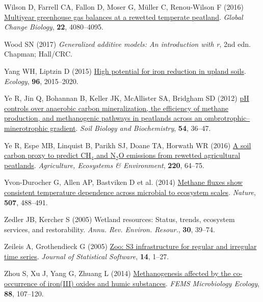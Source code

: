 \documentclass[
  12pt,
]{article}
\newlength{\cslhangindent}
\newenvironment{CSLReferences}[2] %
 {\begin{list}{}{%
  \setlength{\itemindent}{0pt}
  \setlength{\leftmargin}{0pt}
  \setlength{\parsep}{0pt}
  \ifodd #1
   \setlength{\leftmargin}{\cslhangindent}
   \setlength{\itemindent}{-1\cslhangindent}
  \fi
  \setlength{\itemsep}{#2\baselineskip}}}
 {\end{list}}
\begin{document}
\begin{CSLReferences}{1}{0}
Wilson D, Farrell CA, Fallon D, Moser G, Müller C, Renou-Wilson F (2016)
\href{https://doi.org/10.1111/gcb.13325}{Multiyear greenhouse gas
balances at a rewetted temperate peatland}. \emph{Global Change
Biology}, \textbf{22}, 4080--4095.

Wood SN (2017) \emph{\emph{Generalized additive models: An introduction
with r}}, 2nd edn. Chapman; Hall/CRC.

Yang WH, Liptzin D (2015) \href{https://doi.org/10.1890/14-2097.1}{High
potential for iron reduction in upland soils}. \emph{Ecology},
\textbf{96}, 2015--2020.

Ye R, Jin Q, Bohannan B, Keller JK, McAllister SA, Bridgham SD (2012)
\href{https://doi.org/10.1016/j.soilbio.2012.05.015}{{pH} controls over
anaerobic carbon mineralization, the efficiency of methane production,
and methanogenic pathways in peatlands across an
ombrotrophic--minerotrophic gradient}. \emph{Soil Biology and
Biochemistry}, \textbf{54}, 36--47.

Ye R, Espe MB, Linquist B, Parikh SJ, Doane TA, Horwath WR (2016)
\href{https://doi.org/10.1016/j.agee.2016.01.008}{A soil carbon proxy to
predict {CH}\(_4\) and {N\(_2\)O} emissions from rewetted agricultural
peatlands}. \emph{Agriculture, Ecosystems \& Environment}, \textbf{220},
64--75.

Yvon-Durocher G, Allen AP, Bastviken D et al. (2014)
\href{https://doi.org/10.1038/nature13164}{Methane fluxes show
consistent temperature dependence across microbial to ecosystem scales}.
\emph{Nature}, \textbf{507}, 488--491.

Zedler JB, Kercher S (2005) Wetland resources: Status, trends, ecosystem
services, and restorability. \emph{Annu. Rev. Environ. Resour.},
\textbf{30}, 39--74.

Zeileis A, Grothendieck G (2005)
\href{https://doi.org/10.18637/jss.v014.i06}{Zoo: S3 infrastructure for
regular and irregular time series}. \emph{Journal of Statistical
Software}, \textbf{14}, 1--27.

Zhou S, Xu J, Yang G, Zhuang L (2014)
\href{https://doi.org/10.1111/1574-6941.12274}{Methanogenesis affected
by the co-occurrence of iron({III}) oxides and humic substances}.
\emph{{FEMS} Microbiology Ecology}, \textbf{88}, 107--120.

\end{CSLReferences}
\end{document}
